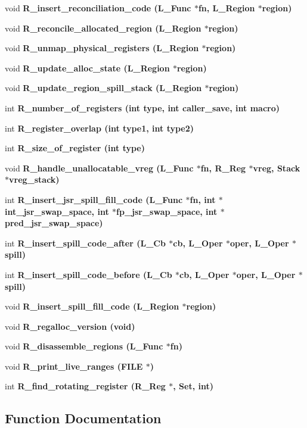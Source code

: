 \begin{CompactItemize}
\item 
void \bf{R\_\-insert\_\-reconciliation\_\-code} (L\_\-Func $\ast$fn, L\_\-Region $\ast$\bf{region})
\item 
void \bf{R\_\-reconcile\_\-allocated\_\-region} (L\_\-Region $\ast$\bf{region})
\item 
void \bf{R\_\-unmap\_\-physical\_\-registers} (L\_\-Region $\ast$\bf{region})
\item 
void \bf{R\_\-update\_\-alloc\_\-state} (L\_\-Region $\ast$\bf{region})
\item 
void \bf{R\_\-update\_\-region\_\-spill\_\-stack} (L\_\-Region $\ast$\bf{region})
\item 
int \bf{R\_\-number\_\-of\_\-registers} (int type, int caller\_\-save, int macro)
\item 
int \bf{R\_\-register\_\-overlap} (int type1, int type2)
\item 
int \bf{R\_\-size\_\-of\_\-register} (int type)
\item 
void \bf{R\_\-handle\_\-unallocatable\_\-vreg} (L\_\-Func $\ast$fn, \bf{R\_\-Reg} $\ast$vreg, \bf{Stack} $\ast$vreg\_\-stack)
\item 
int \bf{R\_\-insert\_\-jsr\_\-spill\_\-fill\_\-code} (L\_\-Func $\ast$fn, int $\ast$int\_\-jsr\_\-swap\_\-space, int $\ast$fp\_\-jsr\_\-swap\_\-space, int $\ast$pred\_\-jsr\_\-swap\_\-space)
\item 
int \bf{R\_\-insert\_\-spill\_\-code\_\-after} (L\_\-Cb $\ast$cb, L\_\-Oper $\ast$oper, L\_\-Oper $\ast$spill)
\item 
int \bf{R\_\-insert\_\-spill\_\-code\_\-before} (L\_\-Cb $\ast$cb, L\_\-Oper $\ast$oper, L\_\-Oper $\ast$spill)
\item 
void \bf{R\_\-insert\_\-spill\_\-fill\_\-code} (L\_\-Region $\ast$\bf{region})
\item 
void \bf{R\_\-regalloc\_\-version} (void)
\item 
void \bf{R\_\-disassemble\_\-regions} (L\_\-Func $\ast$fn)
\item 
void \bf{R\_\-print\_\-live\_\-ranges} (FILE $\ast$)
\item 
int \bf{R\_\-find\_\-rotating\_\-register} (\bf{R\_\-Reg} $\ast$, \bf{Set}, int)
\end{CompactItemize}


\subsection{Function Documentation}
